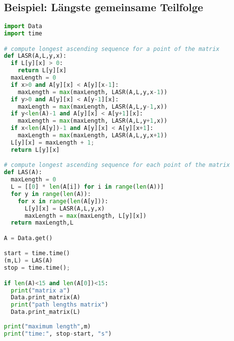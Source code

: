 \subsection{Beispiel: Längste gemeinsame Teilfolge}
\begin{lstlisting}[language=Python]
import Data
import time

# compute longest ascending sequence for a point of the matrix
def LASR(A,L,y,x):
  if L[y][x] > 0:
    return L[y][x]
  maxLength = 0
  if x>0 and A[y][x] < A[y][x-1]: 
    maxLength = max(maxLength, LASR(A,L,y,x-1))
  if y>0 and A[y][x] < A[y-1][x]: 
    maxLength = max(maxLength, LASR(A,L,y-1,x))
  if y<len(A)-1 and A[y][x] < A[y+1][x]: 
    maxLength = max(maxLength, LASR(A,L,y+1,x))
  if x<len(A[y])-1 and A[y][x] < A[y][x+1]: 
    maxLength = max(maxLength, LASR(A,L,y,x+1))
  L[y][x] = maxLength + 1;
  return L[y][x]

# compute longest ascending sequence for each point of the matrix
def LAS(A):
  maxLength = 0
  L = [[0] * len(A[i]) for i in range(len(A))]
  for y in range(len(A)):
    for x in range(len(A[y])):
      L[y][x] = LASR(A,L,y,x)
      maxLength = max(maxLength, L[y][x])
  return maxLength,L

A = Data.get()

start = time.time()
(m,L) = LAS(A)
stop = time.time();

if len(A)<15 and len(A[0])<15:
  print("matrix a")
  Data.print_matrix(A)
  print("path lengths matrix")
  Data.print_matrix(L)
  
print("maximum length",m)
print("time:", stop-start, "s")
\end{lstlisting}\vspace{-6px}

